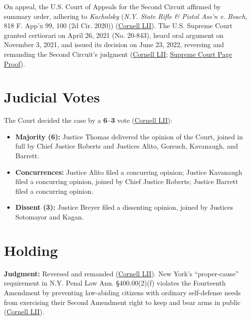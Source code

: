 \documentclass[12pt]{article}
\begin{document}
On appeal, the U.S. Court of Appeals for the Second Circuit affirmed by summary order, adhering to \textit{Kachalsky} (\textit{N.Y. State Rifle \& Pistol Ass'n v. Beach}, 818 F. App'x 99, 100 (2d Cir. 2020)) (\href{https://www.law.cornell.edu/supremecourt/text/20-843}{Cornell LII}). The U.S. Supreme Court granted certiorari on April 26, 2021 (No. 20-843), heard oral argument on November 3, 2021, and issued its decision on June 23, 2022, reversing and remanding the Second Circuit's judgment (\href{https://www.law.cornell.edu/supremecourt/text/20-843}{Cornell LII}; \href{https://www.supremecourt.gov/opinions/21pdf/597us1r54_7648.pdf}{Supreme Court Page Proof}).

\section{Judicial Votes}

The Court decided the case by a \textbf{6--3} vote (\href{https://www.law.cornell.edu/supremecourt/text/20-843}{Cornell LII}):
\begin{itemize}
    \item \textbf{Majority (6):} Justice Thomas delivered the opinion of the Court, joined in full by Chief Justice Roberts and Justices Alito, Gorsuch, Kavanaugh, and Barrett.
    \item \textbf{Concurrences:} Justice Alito filed a concurring opinion; Justice Kavanaugh filed a concurring opinion, joined by Chief Justice Roberts; Justice Barrett filed a concurring opinion.
    \item \textbf{Dissent (3):} Justice Breyer filed a dissenting opinion, joined by Justices Sotomayor and Kagan.
\end{itemize}

\section{Holding}

\textbf{Judgment:} Reversed and remanded (\href{https://www.law.cornell.edu/supremecourt/text/20-843}{Cornell LII}). New York's ``proper-cause'' requirement in N.Y. Penal Law Ann. \S 400.00(2)(f) violates the Fourteenth Amendment by preventing law-abiding citizens with ordinary self-defense needs from exercising their Second Amendment right to keep and bear arms in public (\href{https://www.law.cornell.edu/supremecourt/text/20-843}{Cornell LII}).
\end{document}
